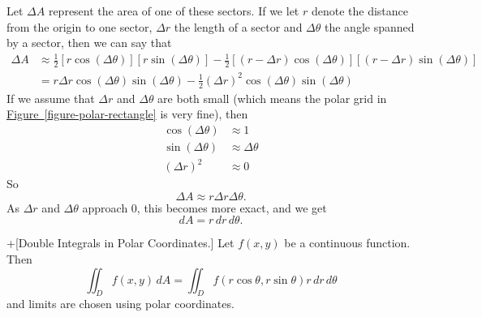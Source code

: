\documentclass[10pt,]{book}
\theoremstyle{ptxplainnotitle}
\theoremstyle{ptxplaintitle}
\theoremstyle{ptxplainnotitle}
\theoremstyle{ptxplaintitle}
\theoremstyle{ptxplainnotitle}
\theoremstyle{ptxplaintitle}
\theoremstyle{ptxdefinitionnotitle}
\theoremstyle{ptxdefinitiontitle}
\theoremstyle{ptxdefinitionnotitle}
\theoremstyle{ptxdefinitiontitle}
\theoremstyle{ptxdefinitionnotitle}
\theoremstyle{ptxdefinitiontitle}
\theoremstyle{ptxdefinitionnotitle}
\theoremstyle{ptxdefinitiontitle}
\theoremstyle{ptxdefinitionnotitle}
\theoremstyle{ptxdefinitiontitle}
\numberwithin{equation}{section}
\begin{document}
%
\par
\hypertarget{p-1143}{}%
Let \(\Delta A\) represent the area of one of these sectors. If we let \(r\) denote the distance from the origin to one sector, \(\Delta r\) the length of a sector and \(\Delta\theta\) the angle spanned by a sector, then we can say that%
\begin{align*}
\Delta A & \approx \frac{1}{2}[r\cos(\Delta\theta)][r\sin(\Delta\theta)] - \frac{1}{2}[(r-\Delta r)\cos(\Delta\theta)][(r-\Delta r)\sin(\Delta\theta)] \\
& = r\Delta r\cos(\Delta\theta)\sin(\Delta\theta) - \frac{1}{2}(\Delta r)^{2}\cos(\Delta\theta)\sin(\Delta\theta)
\end{align*}
If we assume that \(\Delta r\) and \(\Delta\theta\) are both small (which means the polar grid in \hyperref[figure-polar-rectangle]{Figure~\ref{figure-polar-rectangle}} is very fine), then%
\begin{align*}
\cos(\Delta\theta) & \approx 1 \\
\sin(\Delta\theta) & \approx \Delta\theta \\
(\Delta r)^{2} & \approx 0 
\end{align*}
So%
\begin{equation*}
\Delta A \approx r\Delta r\Delta\theta\text{.}
\end{equation*}
As \(\Delta r\) and \(\Delta\theta\) approach \(0\), this becomes more exact, and we get%
\begin{equation*}
dA = r\,dr\,d\theta\text{.}
\end{equation*}
%
\begin{theorem}+[{Double Integrals in Polar Coordinates.}]\label{theorem-double-integrals-in-polar-coordinates}
\hypertarget{p-1144}{}%
Let \(f(x,y)\) be a continuous function. Then%
\begin{equation*}
\iint_{D}f(x,y)\,dA = \iint_{D}f(r\cos\theta,r\sin\theta)r\,dr\,d\theta
\end{equation*}
and limits are chosen using polar coordinates.%
\end{theorem}
\end{document}
